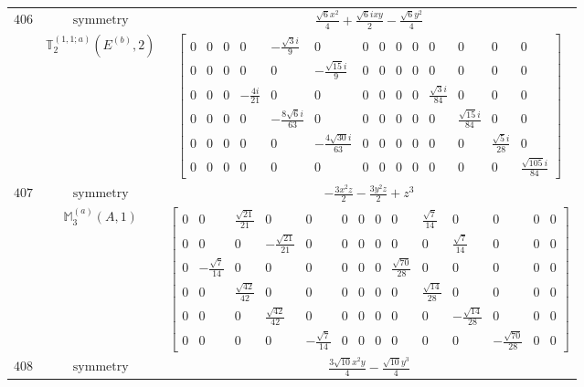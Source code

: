 \documentclass[fleqn,8pt,landscape]{jsarticle}
\begin{document}
\begin{longtable}{ccc}
$ 406 $ & $ \text{symmetry} $ & $ \frac{\sqrt{6} x^{2}}{4} + \frac{\sqrt{6} i x y}{2} - \frac{\sqrt{6} y^{2}}{4} $ \\
$  $ & $ \mathbb{T}_{2}^{(1,1;a)}(E^{(b)},2) $ & $ \begin{bmatrix} 0 & 0 & 0 & 0 & - \frac{\sqrt{3} i}{9} & 0 & 0 & 0 & 0 & 0 & 0 & 0 & 0 & 0 \\ 0 & 0 & 0 & 0 & 0 & - \frac{\sqrt{15} i}{9} & 0 & 0 & 0 & 0 & 0 & 0 & 0 & 0 \\ 0 & 0 & 0 & - \frac{4 i}{21} & 0 & 0 & 0 & 0 & 0 & 0 & \frac{\sqrt{3} i}{84} & 0 & 0 & 0 \\ 0 & 0 & 0 & 0 & - \frac{8 \sqrt{6} i}{63} & 0 & 0 & 0 & 0 & 0 & 0 & \frac{\sqrt{15} i}{84} & 0 & 0 \\ 0 & 0 & 0 & 0 & 0 & - \frac{4 \sqrt{30} i}{63} & 0 & 0 & 0 & 0 & 0 & 0 & \frac{\sqrt{5} i}{28} & 0 \\ 0 & 0 & 0 & 0 & 0 & 0 & 0 & 0 & 0 & 0 & 0 & 0 & 0 & \frac{\sqrt{105} i}{84} \end{bmatrix} $ \\ \hline
$ 407 $ & $ \text{symmetry} $ & $ - \frac{3 x^{2} z}{2} - \frac{3 y^{2} z}{2} + z^{3} $ \\
$  $ & $ \mathbb{M}_{3}^{(a)}(A,1) $ & $ \begin{bmatrix} 0 & 0 & \frac{\sqrt{21}}{21} & 0 & 0 & 0 & 0 & 0 & 0 & \frac{\sqrt{7}}{14} & 0 & 0 & 0 & 0 \\ 0 & 0 & 0 & - \frac{\sqrt{21}}{21} & 0 & 0 & 0 & 0 & 0 & 0 & \frac{\sqrt{7}}{14} & 0 & 0 & 0 \\ 0 & - \frac{\sqrt{7}}{14} & 0 & 0 & 0 & 0 & 0 & 0 & \frac{\sqrt{70}}{28} & 0 & 0 & 0 & 0 & 0 \\ 0 & 0 & \frac{\sqrt{42}}{42} & 0 & 0 & 0 & 0 & 0 & 0 & \frac{\sqrt{14}}{28} & 0 & 0 & 0 & 0 \\ 0 & 0 & 0 & \frac{\sqrt{42}}{42} & 0 & 0 & 0 & 0 & 0 & 0 & - \frac{\sqrt{14}}{28} & 0 & 0 & 0 \\ 0 & 0 & 0 & 0 & - \frac{\sqrt{7}}{14} & 0 & 0 & 0 & 0 & 0 & 0 & - \frac{\sqrt{70}}{28} & 0 & 0 \end{bmatrix} $ \\ \hline
$ 408 $ & $ \text{symmetry} $ & $ \frac{3 \sqrt{10} x^{2} y}{4} - \frac{\sqrt{10} y^{3}}{4} $ \\

\end{longtable}
\end{document}
